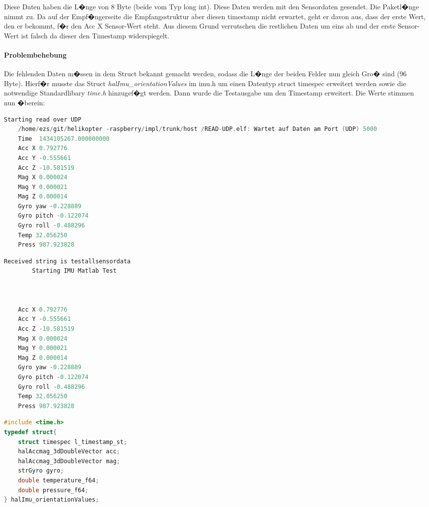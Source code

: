 Diese Daten haben die L�nge von 8 Byte (beide vom Typ long int). Diese Daten werden mit den Sensordaten gesendet. Die Paketl�nge nimmt zu.
Da auf der Empf�ngerseite die Empfangsstruktur aber diesen timestamp nicht erwartet, geht er davon aus, dass der erste Wert, den er bekommt, f�r den Acc X Sensor-Wert steht.
Aus diesem Grund verrutschen die restlichen Daten um eins ab und der erste Sensor-Wert ist falsch da dieser den Timestamp widerspiegelt.

\paragraph{Problembehebung}
Die fehlenden Daten m�ssen in dem Struct bekannt gemacht werden, sodass die L�nge der beiden Felder nun gleich Gro� sind (96 Byte).
Hierf�r musste das Struct \emph{halImu\_orientationValues} im imu.h um einen Datentyp struct timespec erweitert werden sowie die notwendige Standardlibary \emph{time.h} hinzugef�gt werden.
Dann wurde die Testausgabe um den Timestamp erweitert.
Die Werte stimmen nun �berein:
\begin{multicols}{2}
	\begin{lstlisting}[language=C++]
	Starting read over UDP
	/home/ezs/git/helikopter -raspberry/impl/trunk/host /READ-UDP.elf: Wartet auf Daten am Port (UDP) 5000
	Time  1434105267.000000000 
	Acc X 0.792776 
	Acc Y -0.555661 
	Acc Z -10.581519 
	Mag X 0.000024 
	Mag Y 0.000021 
	Mag Z 0.000014 
	Gyro yaw -0.228889 
	Gyro pitch -0.122074 
	Gyro roll -0.488296 
	Temp 32.056250 
	Press 987.923828 
	\end{lstlisting}
	\columnbreak
	\begin{lstlisting}[language=C++]
	 Received string is testallsensordata 
		Starting IMU Matlab Test
		 
	
	
	Acc X 0.792776 
	Acc Y -0.555661 
	Acc Z -10.581519 
	Mag X 0.000024 
	Mag Y 0.000021 
	Mag Z 0.000014 
	Gyro yaw -0.228889 
	Gyro pitch -0.122074 
	Gyro roll -0.488296 
	Temp 32.056250 
	Press 987.923828 
	\end{lstlisting}
\end{multicols}

\begin{lstlisting}[language=C++]
#include <time.h>
typedef struct{
	struct timespec l_timestamp_st;
	halAccmag_3dDoubleVector acc;
	halAccmag_3dDoubleVector mag;
	strGyro gyro;
	double temperature_f64;
	double pressure_f64;
} halImu_orientationValues;

\end{lstlisting}

